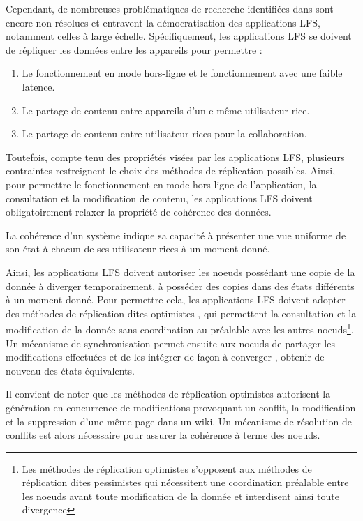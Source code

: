 Cependant, de nombreuses problématiques de recherche identifiées dans \cite{localfirstsoftware2019} sont encore non résolues et entravent la démocratisation des applications \ac{LFS}, notamment celles à large échelle.
Spécifiquement, les applications \ac{LFS} se doivent de répliquer les données entre les appareils pour permettre :
\begin{enumerate}
  \item Le fonctionnement en mode hors-ligne et le fonctionnement avec une faible latence.
  \item Le partage de contenu entre appareils d'un-e même utilisateur-rice.
  \item Le partage de contenu entre utilisateur-rices pour la collaboration.
\end{enumerate}

Toutefois, compte tenu des propriétés visées par les applications \ac{LFS}, plusieurs contraintes restreignent le choix des méthodes de réplication possibles.
Ainsi, pour permettre le fonctionnement en mode hors-ligne de l'application, \ie la consultation et la modification de contenu, les applications \ac{LFS} doivent obligatoirement relaxer la propriété de cohérence des données.
\begin{definition}[Cohérence]
  La cohérence d'un système indique sa capacité à présenter une vue uniforme de son état à chacun de ses utilisateur-rices à un moment donné.
\end{definition}

Ainsi, les applications \ac{LFS} doivent autoriser les noeuds possédant une copie de la donnée à diverger temporairement, \ie à posséder des copies dans des états différents à un moment donné.
Pour permettre cela, les applications \ac{LFS} doivent adopter des méthodes de réplication dites optimistes \cite{2005-optimistic-replication-saito}, \ie qui permettent la consultation et la modification de la donnée sans coordination au préalable avec les autres noeuds\footnote{Les méthodes de réplication optimistes s'opposent aux méthodes de réplication dites pessimistes qui nécessitent une coordination préalable entre les noeuds avant toute modification de la donnée et interdisent ainsi toute divergence}.
Un mécanisme de synchronisation permet ensuite aux noeuds de partager les modifications effectuées et de les intégrer de façon à converger \cite{10.1145/224057.224070}, \ie obtenir de nouveau des états équivalents.

Il convient de noter que les méthodes de réplication optimistes autorisent la génération en concurrence de modifications provoquant un conflit, \eg la modification et la suppression d'une même page dans un wiki.
Un mécanisme de résolution de conflits est alors nécessaire pour assurer la cohérence à terme des noeuds.

